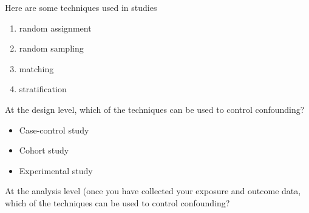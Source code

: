
Here are some techniques used in studies
\begin{enumerate}[(1)]
\item random assignment
\item random sampling
\item matching
\item stratification
\end{enumerate}


At the design level, which of the techniques can be used to control confounding?

\begin{itemize}
\item Case-control study 
\item Cohort study 
\item Experimental study 
\end{itemize}

At the analysis level (once you have collected your exposure and outcome data, which of the techniques can be used to control confounding? 

